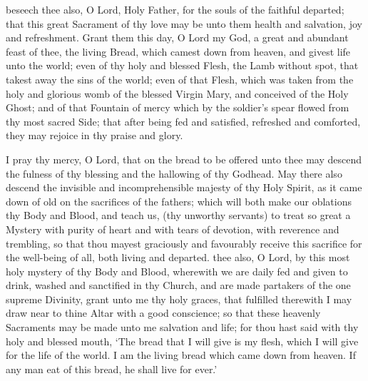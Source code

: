  beseech thee also, O Lord, Holy Father, for the souls of the faithful departed; that this great Sacrament of thy love may be unto them health and salvation, joy and refreshment. Grant them this day, O Lord my God, a great and abundant feast of thee, the living Bread, which camest down from heaven, and givest life unto the world; even of thy holy and blessed Flesh, the Lamb without spot, that takest away the sins of the world; even of that Flesh, which was taken from the holy and glorious womb of the blessed Virgin Mary, and conceived of the Holy Ghost; and of that Fountain of mercy which by the soldier's spear flowed from thy most sacred Side; that after being fed and satisfied, refreshed and comforted, they may rejoice in thy praise and glory.
\par
I pray thy mercy, O Lord, that on the bread to be offered unto thee may descend the fulness of thy blessing and the hallowing of thy Godhead. May there also descend the invisible and incomprehensible majesty of thy Holy Spirit, as it came down of old on the sacrifices of the fathers; which will both make our oblations thy Body and Blood, and teach us, (thy unworthy servants) to treat so great a Mystery with purity of heart and with tears of devotion, with reverence and trembling, so that thou mayest graciously and favourably receive this sacrifice for the well-being of all, both living and departed. 
 thee also, O Lord, by this most holy mystery of thy Body and Blood, wherewith we are daily fed and given to drink, washed and sanctified in thy Church, and are made partakers of the one supreme Divinity, grant unto me thy holy graces, that fulfilled therewith I may draw near to thine Altar with a good conscience; so that these heavenly Sacraments may be made unto me salvation and life; for thou hast said with thy holy and blessed mouth, `The bread that I will give is my flesh, which I will give for the life of the world. I am the living bread which came down from heaven. If any man eat of this bread, he shall live for ever.'
\par

